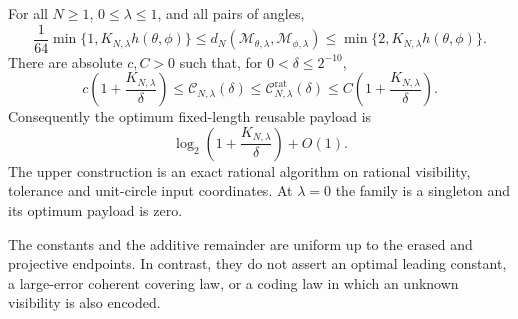 \begin{theorem}\label{thm:noisycoding73}
For all $N\ge1$, $0\le\lambda\le1$, and all pairs of angles,
\begin{equation}\label{eq:noisymetric73}
 \frac1{64}\min\{1,K_{N,\lambda}h(\theta,\phi)\}
 \le d_N(\mathcal M_{\theta,\lambda},\mathcal M_{\phi,\lambda})
 \le\min\{2,K_{N,\lambda}h(\theta,\phi)\}.
\end{equation}
There are absolute $c,C>0$ such that, for $0<\delta\le2^{-10}$,
\begin{equation}\label{eq:noisycover73}
 c\left(1+\frac{K_{N,\lambda}}\delta\right)
 \le\mathcal C_{N,\lambda}(\delta)
 \le\mathcal C^{\mathrm{rat}}_{N,\lambda}(\delta)
 \le C\left(1+\frac{K_{N,\lambda}}\delta\right).
\end{equation}
Consequently the optimum fixed-length reusable payload is
\begin{equation}\label{eq:noisybits73}
 \log_2\left(1+\frac{K_{N,\lambda}}\delta\right)+O(1).
\end{equation}
The upper construction is an exact rational algorithm on rational
visibility, tolerance and unit-circle input coordinates. At $\lambda=0$
the family is a singleton and its optimum payload is zero.
\end{theorem}
The constants and the additive remainder are uniform up to the erased
and projective endpoints. In contrast, they do not assert an optimal
leading constant, a large-error coherent covering law, or a coding law
in which an unknown visibility is also encoded.

